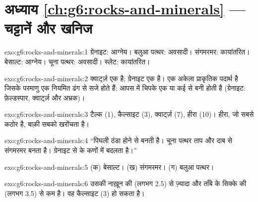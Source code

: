 \section*{अध्याय \ref{ch:g6:rocks-and-minerals} --- चट्टानें और खनिज}

\begin{solution}{exo:g6:rocks-and-minerals:1}
ग्रेनाइट: आग्नेय। बलुआ पत्थर: अवसादी। संगमरमर: कायांतरित। बेसाल्ट:
आग्नेय। चूना पत्थर: अवसादी। स्लेट: कायांतरित।
\end{solution}

\begin{solution}{exo:g6:rocks-and-minerals:2}
क्वार्ट्ज़ एक  है; ग्रेनाइट एक  है।  एक अकेला प्राकृतिक पदार्थ है
जिसके परमाणु एक नियमित ढंग से सजे होते हैं;  आपस में चिपके एक या कई  से
बनी होती है (ग्रेनाइट: फ़ेल्डस्पार, क्वार्ट्ज़ और अभ्रक)।
\end{solution}

\begin{solution}{exo:g6:rocks-and-minerals:3}
टैल्क (1), कैल्साइट (3), क्वार्ट्ज़ (7), हीरा (10)। हीरा, जो सबसे कठोर है,
बाक़ी सबको खरोंचता है।
\end{solution}

\begin{solution}{exo:g6:rocks-and-minerals:4}
``पिघली  ठंडा होने से  बनती है। चूना पत्थर ताप और दाब से
संगमरमर बनता है। ग्रेनाइट  से  के कणों में
बदलता है।''
\end{solution}

\begin{solution}{exo:g6:rocks-and-minerals:5}
(क) बेसाल्ट। (ख) संगमरमर। (ग) बलुआ पत्थर।
\end{solution}

\begin{solution}{exo:g6:rocks-and-minerals:6}
उसकी  नाख़ून की  (लगभग 2.5) से ज़्यादा और ताँबे के सिक्के की 
(लगभग 3.5) से कम है। वह कैल्साइट (3) हो सकता है।
\end{solution}

